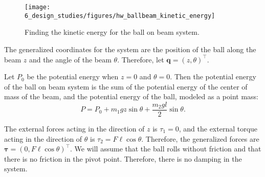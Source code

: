 
\begin{figure}[htb]
  \centering
  \texttt{[image: 6\_design\_studies/figures/hw\_ballbeam\_kinetic\_energy]}
  \caption{Finding the kinetic energy for the ball on beam system.}
  \label{fig:hw_ballbeam_kinetic energy}
\end{figure}

The generalized coordinates for the system are the position of the ball along the beam $z$ and the angle of the beam $\theta$.  Therefore, let $\mathbf{q} = (z, \theta)^\top$.

Let $P_0$ be the potential energy when $z=0$ and $\theta=0$.  Then the potential energy of the ball on beam system is the sum of the potential energy of the center of mass of the beam, and the potential energy of the ball, modeled as a point mass:
\begin{equation*}
  P = P_0 + m_1 g z \sin\theta + \frac{m_2 g l}{2} \sin\theta.
\end{equation*}

The external forces acting in the direction of $z$ is $\tau_1 = 0$, and the external torque acting in the direction of $\theta$ is $\tau_2= F \ell\cos\theta$.  Therefore, the generalized forces are $\boldsymbol{\tau}=(0, F\ell\cos\theta)^\top$.  We will assume that the ball rolls without friction and that there is no friction in the pivot point.  Therefore, there is no damping in the system.

